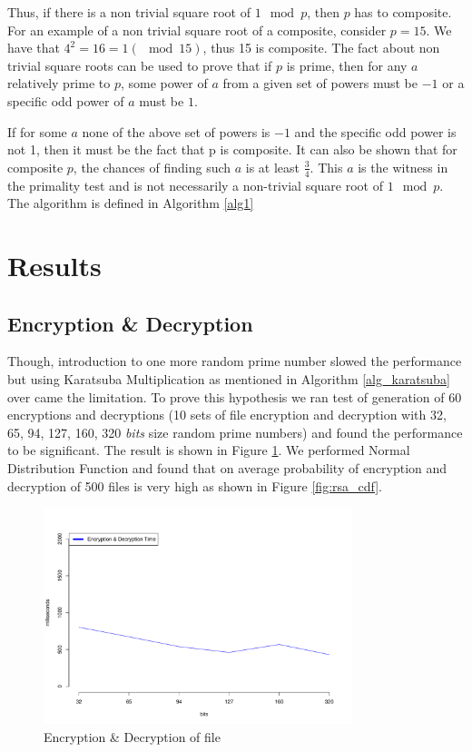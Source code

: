 \documentclass[conference]{IEEEtran}
\begin{document}
Thus, if there is a non trivial square root of $1 \mod p$, then $p$ has to composite. For an example of a non trivial square root of a composite, consider $p = 15$. We have that $4^{2} = 16 = 1 (\mod 15)$, thus 15 is composite. The fact about non trivial square roots can be used to prove that if $p$ is prime, then for any $a$ relatively prime to $p$, some power of $a$ from a given set of powers must be $-1$ or a specific odd power of $a$ must be $1$.


If for some $a$ none of the above set of powers is $-1$ and the specific odd power is not 1, then it must be the fact that p is composite. It can also be shown that for composite $p$, the chances of finding such $a$ is at least $\frac{3}{4}$. This $a$ is the witness in the primality test and is not necessarily a non-trivial square root of $1 \mod p$. The algorithm is defined in Algorithm \ref{alg1}


%	
 
\section{{\LARGE Results}}


\subsection{{\large Encryption \& Decryption}}

Though, introduction to one more random prime number slowed the performance but using Karatsuba Multiplication as mentioned in Algorithm \ref{alg_karatsuba} over came the limitation. To prove this hypothesis we ran test of generation of 60 encryptions and decryptions (10 sets of file encryption and decryption with 32, 65, 94, 127, 160, 320 \emph{bits} size random prime numbers) and found the performance to be significant. The result is shown in Figure \ref{fig:rsa_time}. We performed Normal Distribution Function and found that on average probability of encryption and decryption of 500 files is very high as shown in Figure \ref{fig:rsa_cdf}.

\begin{figure}[ht!]
\centering
\includegraphics[width=90mm]{images/encryptionTime.pdf}
\caption{Encryption \& Decryption of file}
\label{fig:rsa_time}
\end{figure}
\end{document}
